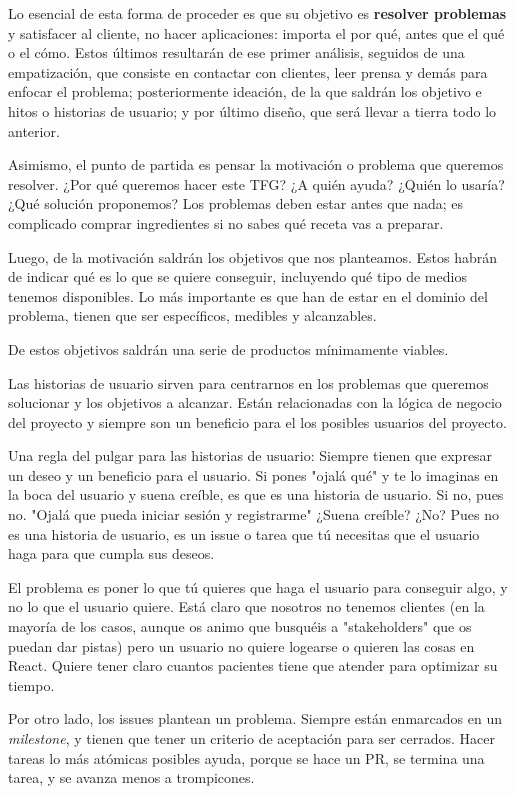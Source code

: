 Lo esencial de esta forma de proceder es que su objetivo es \textbf{resolver problemas} y satisfacer 
al cliente, no hacer aplicaciones: importa el por qué, antes que el qué o el cómo. Estos 
últimos resultarán de ese primer análisis, seguidos de una empatización, que consiste 
en contactar con clientes, leer prensa y demás para enfocar el problema; posteriormente 
ideación, de la que saldrán los objetivo e hitos o historias de usuario; y por último diseño, 
que será llevar a tierra todo lo anterior. 

Asimismo, el punto de partida es pensar la motivación o problema que queremos resolver. 
¿Por qué queremos hacer este TFG? ¿A quién ayuda? ¿Quién lo usaría? ¿Qué solución proponemos? 
Los problemas deben estar antes que nada; es complicado comprar ingredientes si no sabes qué 
receta vas a preparar. 

Luego, de la motivación saldrán los objetivos que nos planteamos. Estos habrán de indicar 
qué es lo que se quiere conseguir, incluyendo qué tipo de medios tenemos disponibles. Lo 
más importante es que han de estar en el dominio del problema, tienen que ser específicos, 
medibles y alcanzables\cite{objetivos}. 

De estos objetivos saldrán una serie de productos mínimamente viables. 

Las historias de usuario sirven para centrarnos en los problemas que queremos solucionar 
y los objetivos a alcanzar. Están relacionadas con la lógica de 
negocio del proyecto y siempre son un beneficio para el los posibles usuarios del proyecto.

Una regla del pulgar para las historias de usuario: Siempre tienen que expresar un deseo y un 
beneficio para el usuario. Si pones "ojalá qué" y te lo imaginas en la boca del usuario y suena 
creíble, es que es una historia de usuario. Si no, pues no.
"Ojalá que pueda iniciar sesión y registrarme" ¿Suena creíble? ¿No? Pues no es una historia 
de usuario, es un issue o tarea que tú necesitas que el usuario haga para que cumpla sus deseos.


El problema es poner lo que tú quieres que haga el usuario para conseguir algo, y no lo que el 
usuario quiere. Está claro que nosotros no tenemos clientes (en la mayoría de los casos, aunque 
os animo que busquéis a "stakeholders" que os puedan dar pistas) pero un usuario no quiere 
logearse o quieren las cosas en React. Quiere tener claro cuantos pacientes tiene que atender 
para optimizar su tiempo.

Por otro lado, los issues  plantean un problema. Siempre están enmarcados en un \textit{milestone}, 
y tienen que tener un criterio de aceptación para ser cerrados. Hacer tareas lo más atómicas posibles ayuda, porque 
se hace un PR, se termina una tarea, y se avanza menos a trompicones.

